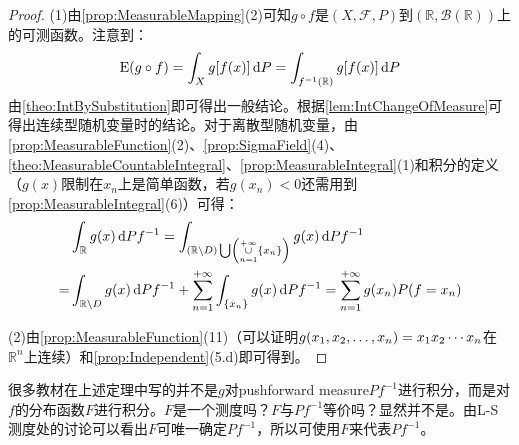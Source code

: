 \begin{proof}
	(1)由\cref{prop:MeasurableMapping}(2)可知$g\circ f$是$(X,\mathscr{F},P)$到$(\mathbb{R},\mathcal{B}(\mathbb{R}))$上的可测函数。注意到：
	\begin{equation*}
		\operatorname{E}(g\circ f)=\int_{X}g[f(x)]\mathop{}\!\mathrm{d} P=\int_{f^{-1}(\mathbb{R})}g[f(x)]\mathop{}\!\mathrm{d} P
	\end{equation*}
	由\cref{theo:IntBySubstitution}即可得出一般结论。根据\cref{lem:IntChangeOfMeasure}可得出连续型随机变量时的结论。对于离散型随机变量，由\cref{prop:MeasurableFunction}(2)、\cref{prop:SigmaField}(4)、\cref{theo:MeasurableCountableIntegral}、\cref{prop:MeasurableIntegral}(1)和积分的定义（$g(x)$限制在$x_n$上是简单函数，若$g(x_n)<0$还需用到\cref{prop:MeasurableIntegral}(6)）可得：
	\begin{align*}
		&\int_{\mathbb{R}}g(x)\mathop{}\!\mathrm{d} Pf^{-1}=\int_{(\mathbb{R}\setminus D)\bigcup\left(\underset{n=1}{\overset{+\infty}{\cup}}\{x_n\}\right)}g(x)\mathop{}\!\mathrm{d} Pf^{-1} \\
		=&\int_{\mathbb{R}\setminus D}g(x)\mathop{}\!\mathrm{d} Pf^{-1}+\sum_{n=1}^{+\infty}\int_{\{x_n\}}g(x)\mathop{}\!\mathrm{d} Pf^{-1}=\sum_{n=1}^{+\infty}g(x_n)P(f=x_n)
	\end{align*}\par
	(2)由\cref{prop:MeasurableFunction}(11)（可以证明$g(x_1, x_2, \dots, x_{n})=x_1x_2\cdots x_n$在$\mathbb{R}^{n}$上连续）和\cref{prop:Independent}(5.d)即可得到。
\end{proof}
\begin{note}
	很多教材在上述定理中写的并不是$g$对pushforward measure$Pf^{-1}$进行积分，而是对$f$的分布函数$F$进行积分。$F$是一个测度吗？$F$与$Pf^{-1}$等价吗？显然并不是。由L-S测度处的讨论可以看出$F$可唯一确定$Pf^{-1}$，所以可使用$F$来代表$Pf^{-1}$。
\end{note}

